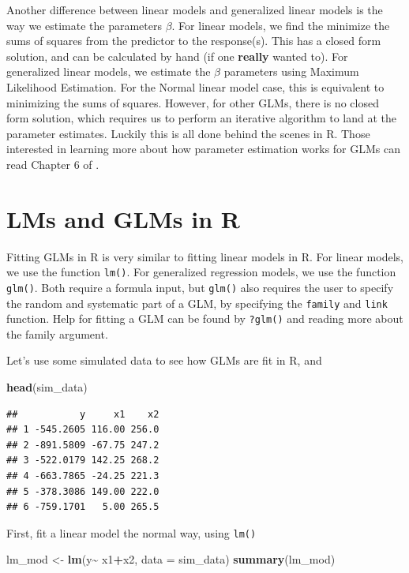 \documentclass[
]{book}
\newenvironment{Shaded}{\begin{snugshade}}{\end{snugshade}}
\newcommand{\DataTypeTok}[1]{\textcolor[rgb]{0.13,0.29,0.53}{#1}}
\newcommand{\KeywordTok}[1]{\textcolor[rgb]{0.13,0.29,0.53}{\textbf{#1}}}
\newcommand{\NormalTok}[1]{#1}
\newcommand{\OperatorTok}[1]{\textcolor[rgb]{0.81,0.36,0.00}{\textbf{#1}}}
\newcommand{\StringTok}[1]{\textcolor[rgb]{0.31,0.60,0.02}{#1}}
\begin{document}
Another difference between linear models and generalized linear models is the way we estimate the parameters \(\beta\). For linear models, we find the minimize the sums of squares from the predictor to the response(s). This has a closed form solution, and can be calculated by hand (if one \textbf{really} wanted to). For generalized linear models, we estimate the \(\beta\) parameters using Maximum Likelihood Estimation. For the Normal linear model case, this is equivalent to minimizing the sums of squares. However, for other GLMs, there is no closed form solution, which requires us to perform an iterative algorithm to land at the parameter estimates. Luckily this is all done behind the scenes in R. Those interested in learning more about how parameter estimation works for GLMs can read Chapter 6 of \citep{dunn2018generalized}.

\hypertarget{lms-and-glms-in-r}{%
\section{LMs and GLMs in R}\label{lms-and-glms-in-r}}

Fitting GLMs in R is very similar to fitting linear models in R. For linear models, we use the function \texttt{lm()}. For generalized regression models, we use the function \texttt{glm()}. Both require a formula input, but \texttt{glm()} also requires the user to specify the random and systematic part of a GLM, by specifying the \texttt{family} and \texttt{link} function. Help for fitting a GLM can be found by \texttt{?glm()} and reading more about the family argument.

Let's use some simulated data to see how GLMs are fit in R, and

\begin{Shaded}
\begin{Highlighting}[]
\KeywordTok{head}\NormalTok{(sim\_data)}
\end{Highlighting}
\end{Shaded}

\begin{verbatim}
##           y     x1    x2
## 1 -545.2605 116.00 256.0
## 2 -891.5809 -67.75 247.2
## 3 -522.0179 142.25 268.2
## 4 -663.7865 -24.25 221.3
## 5 -378.3086 149.00 222.0
## 6 -759.1701   5.00 265.5
\end{verbatim}

First, fit a linear model the normal way, using \texttt{lm()}

\begin{Shaded}
\begin{Highlighting}[]
\NormalTok{lm\_mod \textless{}{-}}\StringTok{ }\KeywordTok{lm}\NormalTok{(y}\OperatorTok{\textasciitilde{}}\StringTok{ }\NormalTok{x1}\OperatorTok{+}\NormalTok{x2, }\DataTypeTok{data =}\NormalTok{ sim\_data)}
\KeywordTok{summary}\NormalTok{(lm\_mod)}
\end{Highlighting}
\end{Shaded}
\end{document}
